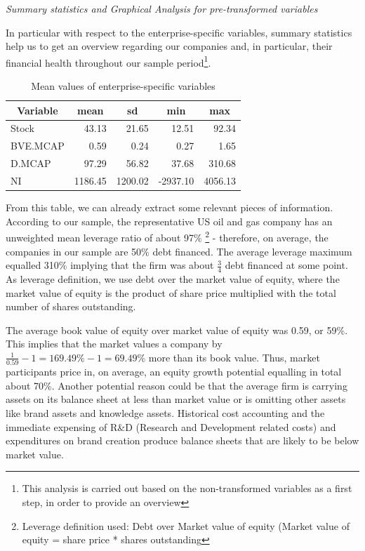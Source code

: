 \documentclass[a4paper]{article}
\begin{document}
\emph{Summary statistics and Graphical Analysis for pre-transformed variables}

In particular with respect to the enterprise-specific variables, summary statistics help us to get an overview regarding our companies and, in particular, their financial health throughout our sample period\footnote{This analysis is carried out based on the non-transformed variables as a first step, in order to provide an overview}. 

\begin{table}[ht]
\centering
\begin{tabular}{l|r|r|r|r}
\hline
\hline
\multicolumn{1}{c|}{Variable} & \multicolumn{1}{c|}{mean} & \multicolumn{1}{c|}{sd} & \multicolumn{1}{c|}{min} & \multicolumn{1}{c}{max} \\
\hline
Stock & 43.13 & 21.65 & 12.51 & 92.34 \\ 
BVE.MCAP & 0.59 & 0.24 & 0.27 & 1.65 \\ 
D.MCAP & 97.29 & 56.82 & 37.68 & 310.68 \\ 
NI & 1186.45 & 1200.02 & -2937.10 & 4056.13\\ 
\hline
\hline
\end{tabular}
\label{}
\caption{Mean values of enterprise-specific variables}  
\end{table}

From this table, we can already extract some relevant pieces of information. According to our sample, the representative US oil and gas company has an unweighted mean leverage ratio of about 97\% \footnote{Leverage definition used: Debt over Market value of equity (Market value of equity = share price * shares outstanding} - therefore, on average, the companies in our sample are 50\% debt financed. The average leverage maximum equalled 310\% implying that the firm was about $\frac{3}{4}$ debt financed at some point. As leverage definition, we use debt over the market value of equity, where the market value of equity is the product of share price multiplied with the total number of shares outstanding.

The average book value of equity over market value of equity was 0.59, or 59\%. This implies that the market values a company by $\frac{1}{0.59} - 1=169.49\%-1 = 69.49\%$ more than its book value. Thus, market participants price in, on average, an equity growth potential equalling in total about 70\%. Another potential reason could be that the average firm is carrying assets on its balance sheet at less than market value or is omitting other assets like brand assets and knowledge assets. Historical cost accounting and the immediate expensing of R\&D (Research and Development related costs) and expenditures on brand creation produce balance sheets that are likely to be below market value.
\end{document}
